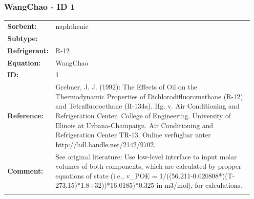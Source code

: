 \subsubsection{WangChao - ID 1}
%
\begin{tabular}[l]{|lp{11.5cm}|}
\hline
\addlinespace

\textbf{Sorbent:} & naphthenic \\
\textbf{Subtype:} &  \\
\textbf{Refrigerant:} & R-12 \\
\textbf{Equation:} & WangChao \\
\textbf{ID:} & 1 \\
\textbf{Reference:} & Grebner, J. J. (1992): The Effects of Oil on the Thermodynamic Properties of Dichlorodifluoromethane (R-12) and Tetrafluoroethane (R-134a). Hg. v. Air Conditioning and Refrigeration Center. College of Engineering. University of Illinois at Urbana-Champaign. Air Conditioning and Refrigeration Center TR-13. Online verfügbar unter http://hdl.handle.net/2142/9702. \\
\textbf{Comment:} & See original literature: Use low-level interface to input molar volumes of both components, which are calculated by propper equations of state (i.e., v\_POE =  1/((56.211-0.020808*((T-273.15)*1.8+32))*16.0185)*0.325 in m3/mol), for calculations. \\

\addlinespace
\hline
\end{tabular}
\newline

